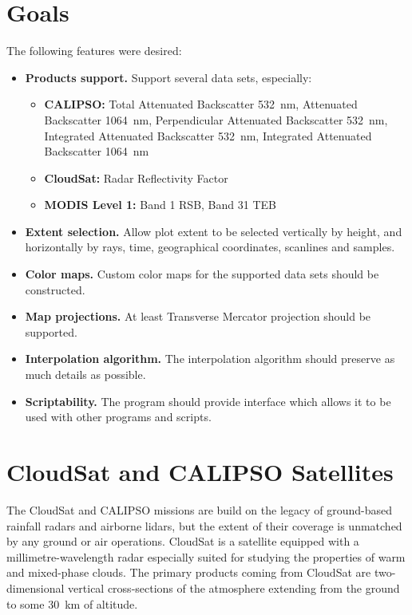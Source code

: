 \section{Goals}
The following features were desired:
\begin{itemize}
\item \textbf{Products support.} Support several data sets, especially:
\begin{itemize}
\item \textbf{CALIPSO:} Total Attenuated Backscatter \SI{532}{nm}, Attenuated Backscatter \SI{1064}{nm},
Perpendicular Attenuated Backscatter \SI{532}{nm}, Integrated Attenuated Backscatter \SI{532}{nm},
Integrated Attenuated Backscatter \SI{1064}{nm}
\item \textbf{CloudSat:} Radar Reflectivity Factor
\item \textbf{MODIS Level 1:} Band 1 RSB, Band 31 TEB
\end{itemize}
\item \textbf{Extent selection.} Allow plot extent to be selected
vertically by height, and horizontally by rays, time, geographical coordinates,
scanlines and samples.
\item \textbf{Color maps.} Custom color maps for the supported data sets should be constructed.
\item \textbf{Map projections.} At least Transverse Mercator projection should be supported.
\item \textbf{Interpolation algorithm.} The interpolation algorithm should preserve
as much details as possible.
\item \textbf{Scriptability.} The program should provide interface which allows
it to be used with other programs and scripts.
\end{itemize}


\section{CloudSat and CALIPSO Satellites}

The CloudSat and CALIPSO missions are build on the legacy of ground-based
rainfall radars and airborne lidars, but the extent of their coverage is
unmatched by any ground or air operations. CloudSat is a satellite equipped
with a millimetre-wavelength radar especially suited for studying the properties
of warm and mixed-phase clouds. The primary products coming from CloudSat are
two-dimensional vertical cross-sections of the atmosphere extending from the
ground to some \SI{30}{km} of altitude.

